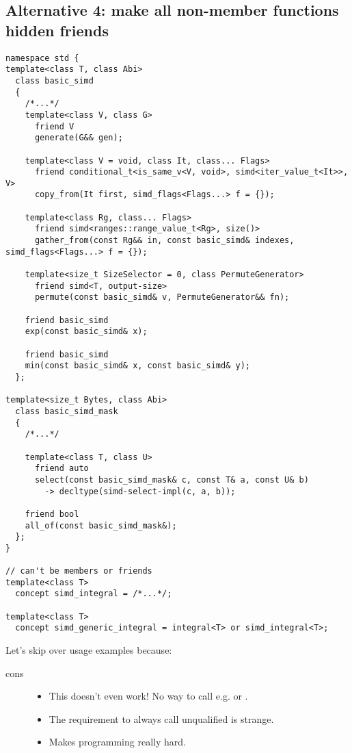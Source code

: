 \subsection{Alternative 4: make all non-member functions hidden friends}

\medskip\begin{lstlisting}[style=Vc]
namespace std {
template<class T, class Abi>
  class basic_simd
  {
    /*...*/
    template<class V, class G>
      friend V
      generate(G&& gen);

    template<class V = void, class It, class... Flags>
      friend conditional_t<is_same_v<V, void>, simd<iter_value_t<It>>, V>
      copy_from(It first, simd_flags<Flags...> f = {});

    template<class Rg, class... Flags>
      friend simd<ranges::range_value_t<Rg>, size()>
      gather_from(const Rg&& in, const basic_simd& indexes, simd_flags<Flags...> f = {});

    template<size_t SizeSelector = 0, class PermuteGenerator>
      friend simd<T, output-size>
      permute(const basic_simd& v, PermuteGenerator&& fn);

    friend basic_simd
    exp(const basic_simd& x);

    friend basic_simd
    min(const basic_simd& x, const basic_simd& y);
  };

template<size_t Bytes, class Abi>
  class basic_simd_mask
  {
    /*...*/

    template<class T, class U>
      friend auto
      select(const basic_simd_mask& c, const T& a, const U& b)
        -> decltype(simd-select-impl(c, a, b));

    friend bool
    all_of(const basic_simd_mask&);
  };
}

// can't be members or friends
template<class T>
  concept simd_integral = /*...*/;

template<class T>
  concept simd_generic_integral = integral<T> or simd_integral<T>;
\end{lstlisting}

Let's skip over usage examples because:

\begin{description}
  \item[cons]
    \begin{itemize}
      \item This doesn't even work!
        No way to call e.g.  or .
      \item The requirement to always call unqualified is strange.
      \item Makes \simdgeneric programming really hard.
    \end{itemize}
\end{description}

